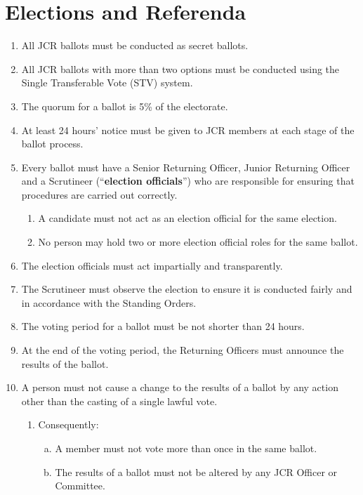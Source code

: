 \documentclass[12pt]{article}
\begin{document}
\section{Elections and Referenda}
\begin{enumerate}
    \item All JCR ballots must be conducted as secret ballots.
    \item All JCR ballots with more than two options must be conducted using the Single Transferable Vote (STV) system.
    \item The quorum for a ballot is 5\% of the electorate.
    \item At least 24 hours' notice must be given to JCR members at each stage of the ballot process.
    \item Every ballot must have a Senior Returning Officer, Junior Returning Officer and a Scrutineer (``\textbf{election officials}'') who are responsible for ensuring that procedures are carried out correctly.
    \begin{enumerate}
        \item A candidate must not act as an election official for the same election.
        \item No person may hold two or more election official roles for the same ballot.
    \end{enumerate}
    \item The election officials must act impartially and transparently.
    \item The Scrutineer must observe the election to ensure it is conducted fairly and in accordance with the Standing Orders.
    \item The voting period for a ballot must be not shorter than 24 hours.
    \item At the end of the voting period, the Returning Officers must announce the results of the ballot.
    \item A person must not cause a change to the results of a ballot by any action other than the casting of a single lawful vote.
    \begin{enumerate}
        \item Consequently:
        \begin{enumerate}[(a)]
            \item A member must not vote more than once in the same ballot.
            \item The results of a ballot must not be altered by any JCR Officer or Committee.
        \end{enumerate}

\end{enumerate}
\end{enumerate}
\end{document}

